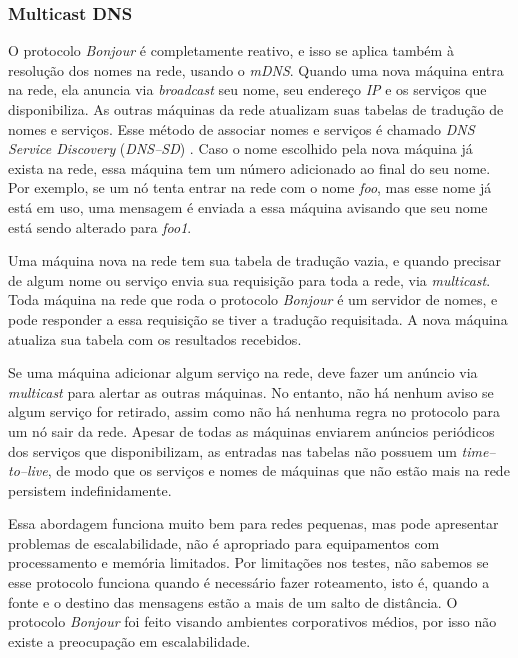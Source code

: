     \subsubsection{Multicast DNS}
    \label{MDNS}
  
        O protocolo \textit{Bonjour} é completamente reativo, e isso se aplica também
        à resolução dos nomes na rede, usando o \textit{mDNS}. Quando uma nova máquina
        entra na rede, ela anuncia via \textit{broadcast} seu nome, seu endereço 
        \emph{IP} e os serviços que disponibiliza. As outras máquinas da rede 
        atualizam suas tabelas de tradução de nomes e serviços. Esse método de 
        associar nomes e serviços é chamado \textit{DNS Service Discovery} 
        (\textit{DNS--SD}) \cite{dnssd}. Caso o nome escolhido pela nova máquina 
        já exista na rede, essa máquina tem um número adicionado ao final do seu 
        nome. Por exemplo, se um nó tenta entrar na rede com o nome \emph{foo}, mas
        esse nome já está em uso, uma mensagem é enviada a essa máquina avisando 
        que seu nome está sendo alterado para \emph{foo1}.

        Uma máquina nova na rede tem sua tabela de tradução vazia, e quando 
        precisar de algum nome ou serviço envia sua requisição para toda a rede,
        via \textit{multicast}. Toda máquina na rede que roda o protocolo
        \textit{Bonjour} é um servidor de nomes, e pode responder a essa 
        requisição se tiver a tradução requisitada. A nova máquina atualiza sua 
        tabela com os resultados recebidos.

        Se uma máquina adicionar algum serviço na rede, deve fazer um anúncio via
        \textit{multicast} para alertar as outras máquinas. No entanto, não há 
        nenhum aviso se algum serviço for retirado, assim como não há nenhuma 
        regra no protocolo para um nó sair da rede. Apesar de todas as máquinas 
        enviarem anúncios periódicos dos serviços que disponibilizam, as entradas
        nas tabelas não possuem um \textit{time--to--live}, de modo que os serviços
        e nomes de máquinas que não estão mais na rede persistem indefinidamente.

        Essa abordagem funciona muito bem para redes pequenas, mas pode apresentar
        problemas de escalabilidade, não é apropriado para equipamentos com 
        processamento e memória limitados. Por limitações nos testes, não sabemos
        se esse protocolo funciona quando é necessário fazer roteamento, isto é,
        quando a fonte e o destino das mensagens estão a mais de um salto de 
        distância. O protocolo \textit{Bonjour} foi feito visando ambientes 
        corporativos médios, por isso não existe a preocupação em escalabilidade.


